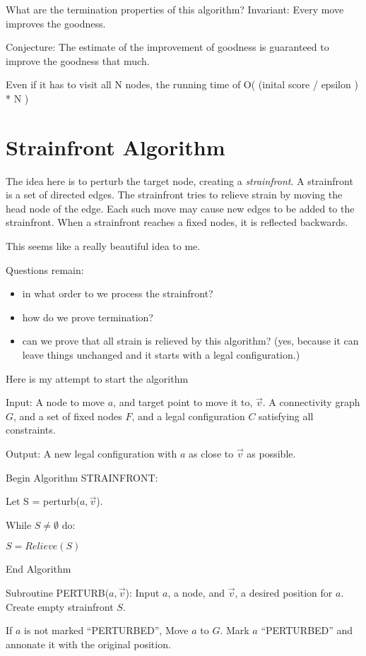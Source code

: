 \documentclass[11pt]{article}
\begin{document}
What are the termination properties of this algorithm?
Invariant: Every move improves the goodness.

Conjecture: The estimate of the improvement of goodness is guaranteed to improve the
goodness that much.

Even if it has to visit all N nodes, the running time of O( (inital score / epsilon ) * N )

\section{Strainfront Algorithm}

The idea here is to perturb the target node, creating a \emph{strainfront}. A strainfront is a
set of directed edges. The strainfront tries to relieve strain by moving the head node of the
edge. Each such move may cause new edges to be added to the strainfront. When a strainfront
reaches a fixed nodes, it is reflected backwards.

This seems like a really beautiful idea to me.

Questions remain:
\begin{itemize}
\item in what order to we process the strainfront?
\item how do we prove termination?
\item can we prove that all strain is relieved by this algorithm? (yes, because
  it can leave things unchanged and it starts with a legal configuration.)
\end{itemize}

Here is my attempt to start the algorithm

Input: A node to move $a$, and target point to move it to, $\vec{v}$.
A connectivity graph $G$, and a set of fixed nodes $F$, and
a legal configuration $C$ satisfying all constraints.

Output: A new legal configuration with $a$ as close to $\vec{v}$ as possible.

Begin Algorithm STRAINFRONT:

Let S = perturb($a,\vec{v}$).

While $S \neq \emptyset$ do:

$ S = Relieve(S) $

End Algorithm


Subroutine PERTURB($a,\vec{v}$):
Input $a$, a node, and $\vec{v}$, a desired position for $a$.
Create empty strainfront $S$.

If $a$ is not marked ``PERTURBED'', Move $a$ to $G$.
Mark $a$ ``PERTURBED'' and annonate it with the original position.
\end{document}
